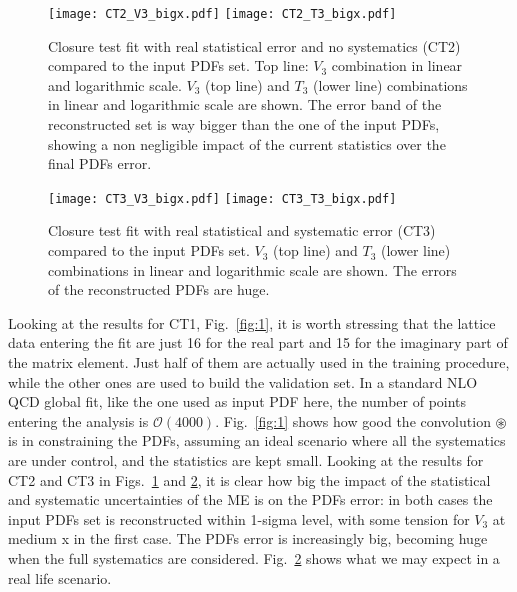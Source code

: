 \begin{figure}[h!]
    \begin{center}
	\texttt{[image: CT2\_V3\_bigx.pdf]}  
	\texttt{[image: CT2\_T3\_bigx.pdf]}  
	\caption{Closure test fit with real statistical error and no systematics (CT2) compared to the input PDFs set. 
		Top line: $V_3$ combination in linear and logarithmic scale.
		$V_3$ (top line) and $T_3$ (lower line) combinations in linear and logarithmic scale are shown.
		The error band of the reconstructed set is way bigger than the one of the input PDFs,
	showing a non negligible impact of the current statistics over the final PDFs error.}
    \label{fig:2}
    \end{center}
\end{figure}

\begin{figure}[h!]
    \begin{center}
	\texttt{[image: CT3\_V3\_bigx.pdf]}  
	\texttt{[image: CT3\_T3\_bigx.pdf]}  
	\caption{Closure test fit with real statistical and systematic error (CT3) compared to the input PDFs set. 
                 $V_3$ (top line) and $T_3$ (lower line) combinations in linear and logarithmic scale are shown.
                 The errors of the reconstructed PDFs are huge.}
    \label{fig:3}
    \end{center}
\end{figure}
\noindent
Looking at the results for CT1, Fig.~\ref{fig:1}, it is worth stressing that the
lattice data entering the fit are just 16 for the real part and 15 for the
imaginary part of the matrix element. Just half of them are actually used in the
training procedure, while the other ones are used to build the validation set.
In a standard NLO QCD global fit, like the one used as input PDF here, the
number of points entering the analysis is $\mathcal{O}\left(4000\right)$. 
Fig.~\ref{fig:1} shows how good the convolution $\circledast$
is in constraining the PDFs, assuming an ideal scenario where all the
systematics are under control, and the statistics are kept small. Looking at the
results for CT2 and CT3 in Figs.~\ref{fig:2} and \ref{fig:3}, it is clear how
big the impact of the statistical and systematic uncertainties of the ME is on
the PDFs error: in both cases the input PDFs set is reconstructed within 1-sigma
level, with some tension for $V_3$ at medium x in the first case. The PDFs error
is increasingly big, becoming huge when the full systematics are considered.
Fig.~\ref{fig:3} shows what we may expect in a real life scenario.

